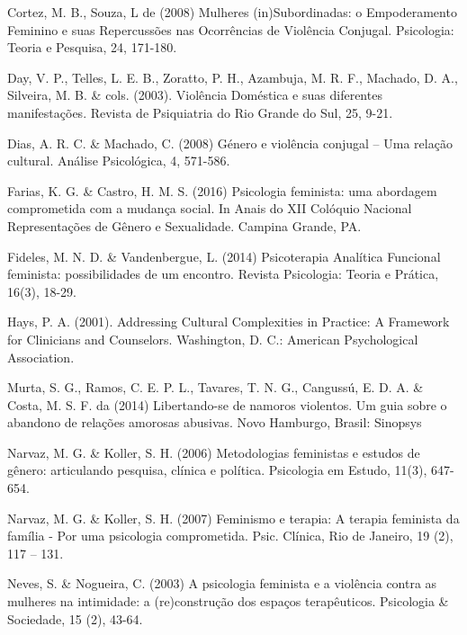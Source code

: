 \hangindent=25pt
\noindent Cortez, M. B., Souza, L de (2008) Mulheres (in)Subordinadas: o Empoderamento Feminino e suas Repercussões nas Ocorrências de Violência Conjugal. Psicologia: Teoria e Pesquisa, 24, 171-180.

\hangindent=25pt
\noindent Day, V. P., Telles, L. E. B., Zoratto, P. H., Azambuja, M. R. F., Machado, D. A., Silveira, M. B. \& cols. (2003). Violência Doméstica e suas diferentes manifestações. Revista de Psiquiatria do Rio Grande do Sul, 25, 9-21.

\hangindent=25pt
\noindent Dias, A. R. C. \& Machado, C. (2008) Género e violência conjugal – Uma relação cultural. Análise Psicológica, 4, 571-586.

\hangindent=25pt
\noindent Farias, K. G. \& Castro, H. M. S. (2016) Psicologia feminista: uma abordagem comprometida com a mudança social. In Anais do XII Colóquio Nacional Representações de Gênero e Sexualidade. Campina Grande, PA.

\hangindent=25pt
\noindent Fideles, M. N. D. \& Vandenbergue, L. (2014) Psicoterapia Analítica Funcional feminista: possibilidades de um encontro. Revista Psicologia: Teoria e Prática, 16(3), 18-29. 

\hangindent=25pt
\noindent Hays, P. A. (2001). Addressing Cultural Complexities in Practice: A Framework for Clinicians and Counselors. Washington, D. C.: American Psychological Association.

\hangindent=25pt
\noindent Murta, S. G., Ramos, C. E. P. L., Tavares, T. N. G., Cangussú, E. D. A. \& Costa, M. S. F. da (2014) Libertando-se de namoros violentos. Um guia sobre o abandono de relações amorosas abusivas. Novo Hamburgo, Brasil: Sinopsys

\hangindent=25pt
\noindent Narvaz, M. G. \& Koller, S. H. (2006) Metodologias feministas e estudos de gênero: articulando pesquisa, clínica e política. Psicologia em Estudo, 11(3), 647-654.

\hangindent=25pt
\noindent Narvaz, M. G. \& Koller, S. H. (2007) Feminismo e terapia: A terapia feminista da família - Por uma psicologia comprometida. Psic. Clínica, Rio de Janeiro, 19 (2), 117 – 131.

\hangindent=25pt
\noindent Neves, S. \& Nogueira, C. (2003) A psicologia feminista e a violência contra as mulheres na intimidade: a (re)construção dos espaços terapêuticos. Psicologia \& Sociedade, 15 (2), 43-64.

